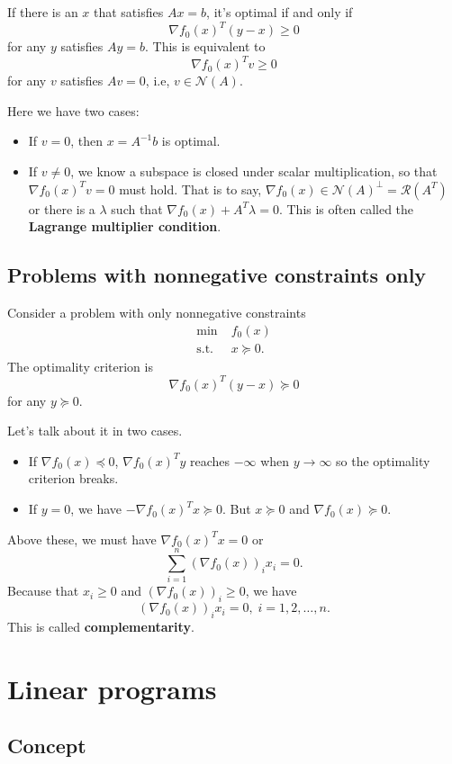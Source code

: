 \documentclass[lang=en,color=blue,mode=fancy,titlestyle=hang]{elegantbook}
\begin{document}
If there is an $x$ that satisfies $A x = b$, it's optimal if and only if
\[
\nabla f_0(x)^T (y - x) \geq 0
\]
for any $y$ satisfies $A y = b$. This is equivalent to
\[
\nabla f_0(x)^T v \geq 0
\]
for any $v$ satisfies $A v = 0$, i.e, $v \in \mathcal{N}(A)$.

Here we have two cases:
\begin{itemize}
  \item If $v = 0$, then $x = A^{-1} b$ is optimal.
  \item If $v \neq 0$, we know a subspace is closed under scalar multiplication, so
  that $\nabla f_0(x)^T v = 0$ must hold. That is to say,
  $\nabla f_0(x) \in \mathcal{N}(A)^{\perp} = \mathcal{R}(A^T)$ or there is a $\lambda$
  such that $\nabla f_0(x) + A^T \lambda = 0$. This is often called the \textbf{Lagrange
  multiplier condition}.
\end{itemize}

\subsection{Problems with nonnegative constraints only}
Consider a problem with only nonnegative constraints
\begin{align*}
  \min \; &f_0(x) \\
  \text{s.t.} \; &x \succeq 0.
\end{align*}
The optimality criterion is
\[
\nabla f_0(x)^T (y - x) \succeq 0
\]
for any $y \succeq 0$.

Let's talk about it in two cases.
\begin{itemize}
  \item If $\nabla f_0(x) \preceq 0$, $\nabla f_0(x)^T y$ reaches $-\infty$ when
  $y \rightarrow \infty$ so the optimality criterion breaks.
  \item If $y = 0$, we have $- \nabla f_0(x)^T x \succeq 0$. But $x \succeq 0$ and
  $\nabla f_0(x) \succeq 0$.
\end{itemize}

Above these, we must have $\nabla f_0(x)^T x = 0$ or
\[
\sum_{i=1}^n (\nabla f_0(x))_i x_i = 0.
\]
Because that $x_i \geq 0$ and $(\nabla f_0(x))_i \geq 0$, we have
\[
(\nabla f_0(x))_i x_i = 0, \; i = 1, 2, \ldots, n.
\]
This is called \textbf{complementarity}.

\section{Linear programs}
\subsection{Concept}
\end{document}
